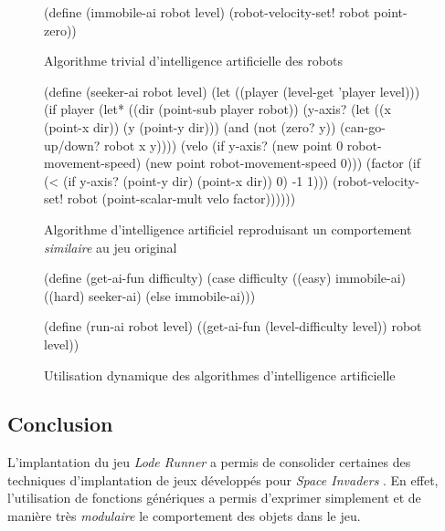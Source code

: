 \documentclass[12pt,oneside,letterpaper,francais]{book}
\newcommand{\lr}{{\textit{Lode Runner }}}
\newcommand{\si}{{\textit{Space Invaders }}}
\begin{document}
\begin{figure}[htb!]
  \begin{schemecode}
(define (immobile-ai robot level)
  (robot-velocity-set! robot point-zero))
  \end{schemecode}
  \caption{Algorithme trivial d'intelligence artificielle des robots}
  \label{Exp:ai-imm}
\end{figure}

\begin{figure}[htb!]
  \begin{schemecode}
(define (seeker-ai robot level)
  (let ((player (level-get 'player level)))
    (if player
        (let* ((dir (point-sub player robot))
               (y-axis? (let ((x (point-x dir)) (y (point-y dir)))
                          (and (not (zero? y))
                               (can-go-up/down? robot x y))))
               (velo (if y-axis?
                         (new point 0 robot-movement-speed)
                         (new point robot-movement-speed 0)))
               (factor (if (< (if y-axis? (point-y dir) (point-x dir)) 0)
                           -1
                           1)))
          (robot-velocity-set! robot (point-scalar-mult velo factor))))))
  \end{schemecode}
  \caption{Algorithme d'intelligence artificiel reproduisant un
    comportement \emph{similaire} au jeu original}
  \label{Exp:ai-seek}
\end{figure}

\begin{figure}[htb!]
  \begin{schemecode}
(define (get-ai-fun difficulty)
  (case difficulty
    ((easy) immobile-ai)
    ((hard) seeker-ai)
    (else immobile-ai)))

(define (run-ai robot level)
  ((get-ai-fun (level-difficulty level)) robot level))
  \end{schemecode}
  \caption{Utilisation dynamique des algorithmes d'intelligence
    artificielle}
  \label{Exp:dyn-ai}
\end{figure}


\subsection{Conclusion}

L'implantation du jeu \lr a permis de consolider certaines des
techniques d'implantation de jeux développés pour \si. En effet,
l'utilisation de fonctions génériques a permis d'exprimer simplement
et de manière très \emph{modulaire} le comportement des objets dans le
jeu.
\end{document}
